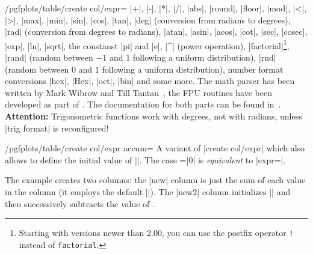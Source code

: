 \documentclass[a4paper]{ltxdoc}
\begin{document}
\begin{stylekey}{/pgfplots/table/create col/expr=}
    |+|, |-|, |*|, |/|, |abs|, |round|, |floor|, |mod|, |<|, |>|, |max|, |min|,
    |sin|, |cos|, |tan|, |deg| (conversion from radians to degrees), |rad|
    (conversion from degrees to radians), |atan|, |asin|, |acos|, |cot|, |sec|,
    |cosec|, |exp|, |ln|, |sqrt|, the constanst |pi| and |e|, |^| (power
    operation), |factorial|\footnote{Starting with \PGF{} versions newer than
    $2.00$, you can use the postfix operator \texttt{!} instead of
    \texttt{factorial}.}, |rand| (random between $-1$ and $1$ following a
    uniform distribution), |rnd| (random between $0$ and $1$ following a
    uniform distribution), number format conversions |hex|, |Hex|, |oct|, |bin|
    and some more. The math parser has been written by Mark Wibrow and Till
    Tantau~\cite{tikz}, the FPU routines have been developed as part of
    \PGFPlots{}. The documentation for both parts can be found in~\cite{tikz}.
    \textbf{Attention:} Trigonometric functions work with degrees, not with
    radians, unless |trig format| is reconfigured!
\end{stylekey}

\begin{stylekey}{/pgfplots/table/create col/expr accum=}
    A variant of |create col/expr| which also allows to define the initial
    value of |\pgfmathaccuma|. The case =|0| is
    \emph{equivalent} to |expr=|.
\begin{codeexample}[]

\end{codeexample}
    The example creates two columns: the |new| column is just the sum of each
    value in the  column (it employs the default
    ||). The |new2| column initializes || and
    then successively subtracts the value of .
\end{stylekey}
\end{document}
